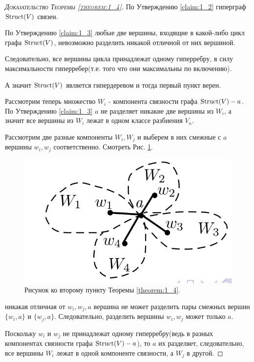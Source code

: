 \begin{proof}[\normalfont\textsc{Доказательство Теоремы \ref{theorem:1_4}}]
	По Утверждению \ref{claim:1_2} гиперграф $\operatorname{Struct}(V)$ связен.

	По Утверждению \ref{claim:1_3} любые две вершины, входящие в какой-либо цикл графа $\operatorname{Struct}(V)$, невозможно разделить никакой отличной от них вершиной.

	Следовательно, все вершины цикла принадлежат одному гиперребру, в силу максимальности гиперребер(т.е. того что они максимальны по включению).

	А значит $\operatorname{Struct}(V)$ является гипердеревом и тогда первый пункт верен.

	Рассмотрим теперь множество $W_i$ - компонента связности графа  $\operatorname{Struct}(V) - a$.
	По Утверждению \ref{claim:1_3}  $a$ не разделяет никакие две вершины из $W_i$, а значит все вершины из $W_i$ лежат в одном классе разбиения $V_a$.

	Рассмотрим две разные компоненты  $W_i, W_j$ и выберем в них смежные с  $a$ вершины $w_i, w_j$ соответственно. Смотреть Рис. \ref{fig:theorem_1_4}.

\begin{figure}[ht]
    \centering
	\includegraphics[width=0.4\columnwidth]{figures/theorem_1_4.png}
	\caption{Рисунок ко второму пункту Теоремы \ref{theorem:1_4}.}
    \label{fig:theorem_1_4}
\end{figure}

никакая отличная от $w_i, w_j, a$ вершина не может разделить пары смежных вершин  $\{w_i, a\}$ и  $\{w_j, a\}$. Следовательно, разделить вершины  $w_i, w_j$ может только  $a$.

Поскольку  $w_i$ и  $w_j$ не принадлежат одному гиперребру(ведь в разных компонентах связности графа $\operatorname{Struct}(V) - a$), то $a$ их разделяет, следовательно, все вершины $W_i$ лежат в одной компоненте связности, а  $W_j$ в другой.


\end{proof}

